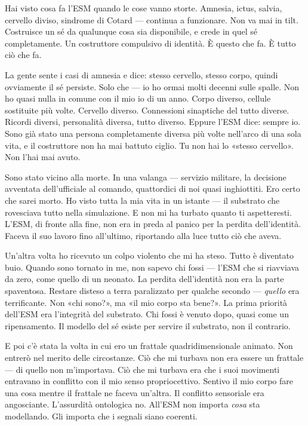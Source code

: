 \documentclass[11pt, twoside, openright]{book}
\begin{document}
Hai visto cosa fa l'ESM quando le cose vanno storte. Amnesia, ictus, salvia, cervello diviso, sindrome di Cotard --- continua a funzionare. Non va mai in tilt. Costruisce un sé da qualunque cosa sia disponibile, e crede in quel sé completamente. Un costruttore compulsivo di identità. È questo che fa. È tutto ciò che fa.

La gente sente i casi di amnesia e dice: stesso cervello, stesso corpo, quindi ovviamente il sé persiste. Solo che --- io ho ormai molti decenni sulle spalle. Non ho quasi nulla in comune con il mio io di un anno. Corpo diverso, cellule sostituite più volte. Cervello diverso. Connessioni sinaptiche del tutto diverse. Ricordi diversi, personalità diversa, tutto diverso. Eppure l'ESM dice: sempre io. Sono già stato una persona completamente diversa più volte nell'arco di una sola vita, e il costruttore non ha mai battuto ciglio. Tu non hai lo «stesso cervello». Non l'hai mai avuto.

Sono stato vicino alla morte. In una valanga --- servizio militare, la decisione avventata dell'ufficiale al comando, quattordici di noi quasi inghiottiti. Ero certo che sarei morto. Ho visto tutta la mia vita in un istante --- il substrato che rovesciava tutto nella simulazione. E non mi ha turbato quanto ti aspetteresti. L'ESM, di fronte alla fine, non era in preda al panico per la perdita dell'identità. Faceva il suo lavoro fino all'ultimo, riportando alla luce tutto ciò che aveva.

Un'altra volta ho ricevuto un colpo violento che mi ha steso. Tutto è diventato buio. Quando sono tornato in me, non sapevo chi fossi --- l'ESM che si riavviava da zero, come quello di un neonato. La perdita dell'identità non era la parte spaventosa. Restare disteso a terra paralizzato per qualche secondo --- \textit{quello} era terrificante. Non «chi sono?», ma «il mio corpo sta bene?». La prima priorità dell'ESM era l'integrità del substrato. Chi fossi è venuto dopo, quasi come un ripensamento. Il modello del sé esiste per servire il substrato, non il contrario.

E poi c'è stata la volta in cui ero un frattale quadridimensionale animato. Non entrerò nel merito delle circostanze. Ciò che mi turbava non era essere un frattale --- di quello non m'importava. Ciò che mi turbava era che i suoi movimenti entravano in conflitto con il mio senso propriocettivo. Sentivo il mio corpo fare una cosa mentre il frattale ne faceva un'altra. Il conflitto sensoriale era angosciante. L'assurdità ontologica no. All'ESM non importa \textit{cosa} sta modellando. Gli importa che i segnali siano coerenti.
\end{document}
